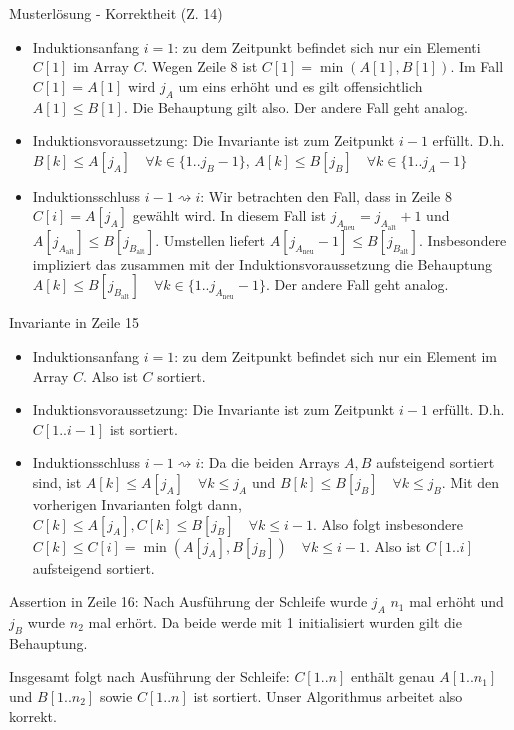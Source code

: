 \documentclass[18pt]{beamer}
\begin{document}
\begin{frame}{Musterlösung - Korrektheit (Z. 14)}
\begin{itemize}
 \item Induktionsanfang $i=1$: zu dem Zeitpunkt befindet sich nur ein Elementi $C[1]$ im Array $C$. Wegen Zeile 8 ist $C[1] = \min(A[1],B[1])$. Im Fall $C[1] = A[1]$ wird $j_A$ um eins erhöht und es gilt offensichtlich $A[1] \leq B[1]$. Die Behauptung gilt also. Der andere Fall geht analog.
 \item Induktionsvoraussetzung: Die Invariante ist zum Zeitpunkt $i-1$ erfüllt. D.h. $B[k] \leq A[j_A] \quad  \forall k \in \{1..j_B-1\}$, $A[k] \leq B[j_B]\quad  \forall k \in \{1..j_A-1\}$
 \item Induktionsschluss $i-1 \rightsquigarrow i$: Wir betrachten den Fall, dass in Zeile 8 $C[i] =  A[j_A]$ gewählt wird. In diesem Fall ist $j_{A_{\text{neu}}} = j_{A_{\text{alt}}} +1 $ und $A[j_{A_{\text{alt}}}] \leq B[j_{B_{\text{alt}}}]$. Umstellen liefert  $A[j_{A_{\text{neu}}}-1] \leq B[j_{B_{\text{alt}}}]$.
	Insbesondere impliziert das zusammen mit der Induktionsvoraussetzung die Behauptung $A[k] \leq B[j_{B_\text{alt}}]\quad  \forall k \in \{1..j_{A_{\text{neu}}}-1\}$. Der andere Fall geht analog.  
\end{itemize}

	
        
	
\end{frame}
\begin{frame}{Invariante in  Zeile 15}
\begin{itemize}
 \item Induktionsanfang $i=1$: zu dem Zeitpunkt befindet sich nur ein Element im Array $C$. Also ist $C$ sortiert. \\
 \item Induktionsvoraussetzung: Die Invariante ist zum Zeitpunkt $i-1$ erfüllt. D.h. $C[1..i-1]$ ist sortiert.\\
 \item 	Induktionsschluss $i-1 \rightsquigarrow i$: Da die beiden Arrays $A, B$ aufsteigend sortiert sind, ist $A[k] \leq A[j_A] \quad \forall k \leq  j_A$ und $B[k] \leq B[j_B] \quad \forall k \leq j_B$. Mit den vorherigen Invarianten folgt dann, $C[k] \leq A[j_A], C[k] \leq B[j_B] \quad 	\forall k \leq i-1$. Also folgt insbesondere $C[k] \leq C[i] = \min(A[j_A],B[j_B]) \quad \forall k \leq i-1 $. Also ist $C[1..i]$ aufsteigend sortiert.

\end{itemize}
\end{frame}

\begin{frame}{Assertion in Zeile 16:} 
Nach Ausführung der Schleife wurde $j_A$ $n_1$ mal erhöht und $j_B$ wurde $n_2$ mal erhört. Da beide werde mit 1 initialisiert wurden gilt die Behauptung.  

Insgesamt folgt nach Ausführung der Schleife:  $C[1..n]$ enthält genau $A[1..n_1]$ und $B[1..n_2]$ sowie $C[1..n]$ ist sortiert. Unser Algorithmus arbeitet also korrekt.
 
\end{frame}
\end{document}
